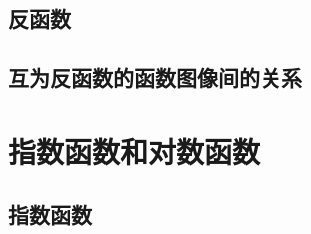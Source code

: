 \subsection{反函数}
\begin{Practice}
  \begin{question}
    \item 
    \item 
  \end{question}
\end{Practice}

\subsection{互为反函数的函数图像间的关系}
\begin{Practice}
  \begin{question}
    \item 
    \item 
    \item 
    \item 
  \end{question}
\end{Practice}

\begin{Exercise}
  \begin{question}
    \item 
    \item 
    \item 
    \item 
    \item 
    \item 
    \item 
    \item 
    \item 
    \item 
    \item 
    \item 
  \end{question}
\end{Exercise}

\section{指数函数和对数函数}
\subsection{指数函数}
\begin{Practice}
  \begin{question}
    \item 
    \item 
    \item 
  \end{question}
\end{Practice}

